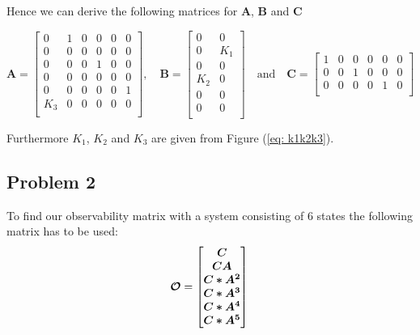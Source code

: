 \newline

Hence we can derive the following matrices for \textbf{A}, \textbf{B} and \textbf{C}

\begin{equation}
  \label{eq:state_space_A_B_C}
  \bm{A} =
  \begin{bmatrix}
    0 & 1 & 0 & 0 & 0 & 0 \\
    0 & 0 & 0 & 0 & 0 & 0 \\
    0 & 0 & 0 & 1 & 0 & 0 \\
    0 & 0 & 0 & 0 & 0 & 0 \\
    0 & 0 & 0 & 0 & 0 & 1 \\
    K_3 & 0 & 0 & 0 & 0 & 0 \\
  \end{bmatrix}
  , \quad \bm{B} =
  \begin{bmatrix}
    0 & 0 \\
    0 & K_1 \\
    0 & 0 \\
    K_2 & 0 \\
    0 & 0 \\
    0 & 0 \\
  \end{bmatrix}
  \quad \text{and} \quad \bm{C} =
  \begin{bmatrix}
    1 & 0 & 0 & 0 & 0 & 0 \\
    0 & 0 & 1 & 0 & 0 & 0 \\
    0 & 0 & 0 & 0 & 1 & 0 \\
  \end{bmatrix}
\end{equation}

\newline

Furthermore $K_1$, $K_2$ and $K_3$ are given from Figure (\ref{eq: k1k2k3}).
\newpage

\subsection{Problem 2}

To find our observability matrix with a system consisting of 6 states the following matrix has to be used:
\begin{equation}
  \bm{\mathcal{O}} =
  \begin{bmatrix}
    \bm{C} \\
    \bm{CA} \\
    \bm{C*A^2} \\
    \bm{C*A^3} \\
    \bm{C*A^4} \\
    \bm{C*A^5} \\
  \end{bmatrix} \\
\end{equation}

